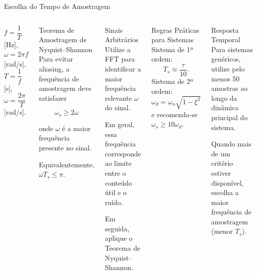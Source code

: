 \begin{frame}{Escolha do Tempo de Amostragem}
  \scriptsize
  \begin{columns}
    \begin{block}{}
      $f=\dfrac{1}{T}$ [Hz], \quad $\omega=2\pi f$ [rad/s], \quad $T=\dfrac{1}{f}$ [s], \quad $\omega=\dfrac{2\pi}{T}$ [rad/s].
    \end{block}
    \begin{block}{Teorema de Amostragem de Nyquist--Shannon}
      Para evitar aliasing, a frequência de amostragem deve satisfazer

      $$\omega_s \ge 2\omega$$

      onde $\omega$ é a maior frequência presente no sinal.

      Equivalentemente,
      $\omega T_s \le \pi.$
    \end{block}
    \begin{block}{Sinais Arbitrários}
      Utilize a FFT para identificar a maior frequência relevante $\omega$ do sinal.

      Em geral, essa frequência corresponde ao limite entre o conteúdo útil e o ruído.

      Em seguida, aplique o Teorema de Nyquist--Shannon.
    \end{block}
    \begin{block}{Regras Práticas para Sistemas}
      Sistema de 1ª ordem:
      $$T_s \approx \frac{\tau}{10}.$$
      Sistema de 2ª ordem:
      $$\omega_d=\omega_n\sqrt{1-\xi^2}$$
      e recomenda-se $\omega_s \ge 10\omega_d.$
    \end{block}
    \begin{block}{Resposta Temporal}
      Para sistemas genéricos, utilize pelo menos 50 amostras ao longo da dinâmica principal do sistema.

      Quando mais de um critério estiver disponível, escolha a maior frequência de amostragem (menor $T_s$).
    \end{block}
  \end{columns}
\end{frame}
